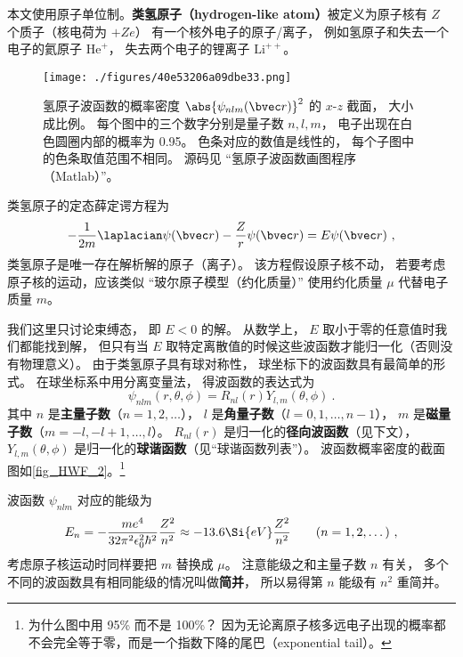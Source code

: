

本文使用原子单位制。\textbf{类氢原子（hydrogen-like atom）}被定义为原子核有 $Z$ 个质子（核电荷为 $+Ze$） 有一个核外电子的原子/离子， 例如氢原子和失去一个电子的氦原子 $\mathrm{He}^+$， 失去两个电子的锂离子 $\mathrm{Li}^{++}$。 %

\begin{figure}[ht]
\centering
\texttt{[image: ./figures/40e53206a09dbe33.png]}
\caption{氢原子波函数的概率密度 $\abs{\psi_{nlm}(\bvec r)}^2$ 的 $x$-$z$ 截面， 大小成比例。 每个图中的三个数字分别是量子数 $n, l, m$， 电子出现在白色圆圈内部的概率为 0.95。 色条对应的数值是线性的， 每个子图中的色条取值范围不相同。 源码见 “氢原子波函数画图程序（Matlab）”。} \label{fig_HWF_2}
\end{figure}

类氢原子的定态薛定谔方程为
\begin{equation}\label{eq_HWF_1}
-\frac{1}{2m} \laplacian \psi(\bvec r) - \frac{Z}{r} \psi(\bvec r) = E \psi(\bvec r)~,
\end{equation}
类氢原子是唯一存在解析解的原子（离子）。 该方程假设原子核不动， 若要考虑原子核的运动，应该类似 “玻尔原子模型（约化质量）” 使用约化质量 $\mu$ 代替电子质量 $m$。

我们这里只讨论束缚态， 即 $E < 0$ 的解。  从数学上， $E$ 取小于零的任意值时我们都能找到解， 但只有当 $E$ 取特定离散值的时候这些波函数才能归一化（否则没有物理意义）。 由于类氢原子具有球对称性， 球坐标下的波函数具有最简单的形式。 在球坐标系中用分离变量法， 得波函数的表达式为
\begin{equation}\label{eq_HWF_3}
\psi_{nlm} (r,\theta ,\phi) = R_{nl}(r) Y_{l,m}(\theta, \phi)~.
\end{equation}
其中 $n$ 是\textbf{主量子数}（$n = 1, 2, \dots$）， $l$ 是\textbf{角量子数}（$l = 0, 1, \dots, n - 1$）， $m$ 是\textbf{磁量子数}（$m = -l, -l+1, \dots, l$）。 $R_{nl}(r)$ 是归一化的\textbf{径向波函数}（见下文）， $Y_{l,m}(\theta, \phi)$ 是归一化的\textbf{球谐函数}（见“球谐函数列表”）。 波函数概率密度的截面图如\autoref{fig_HWF_2}。\footnote{为什么图中用 95\% 而不是 100\%？ 因为无论离原子核多远电子出现的概率都不会完全等于零，而是一个指数下降的尾巴（exponential tail）。}

波函数 $\psi_{nlm}$ 对应的能级为
\begin{equation}\label{eq_HWF_5}
E_n =  - \frac{m e^4}{32 \pi^2 \epsilon_0^2 \hbar ^2} \frac{Z^2}{n^2} \approx - 13.6\Si{eV} \frac{Z^2}{n^2}
\qquad (n = 1, 2, \dots)~,
\end{equation}
考虑原子核运动时同样要把 $m$ 替换成 $\mu$。 注意能级之和主量子数 $n$ 有关， 多个不同的波函数具有相同能级的情况叫做\textbf{简并}， 所以易得第 $n$ 能级有 $n^2$ 重简并。

